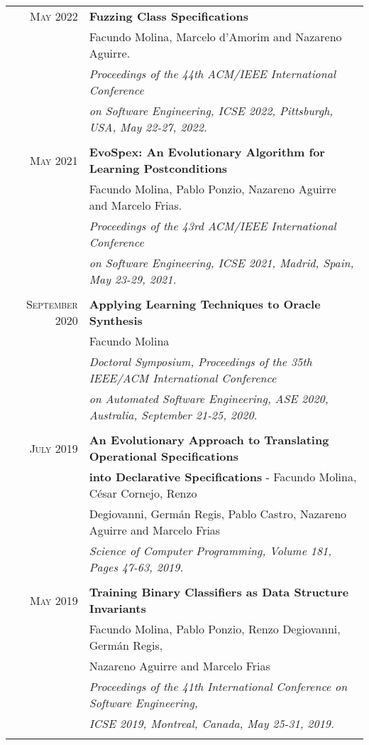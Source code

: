 \documentclass[a4paper,10pt]{article} %
\begin{document}
\begin{longtable}{rl}
\textsc{May} 2022  & \textbf{Fuzzing Class Specifications} \\
	& Facundo Molina, Marcelo d'Amorim and Nazareno Aguirre. \\
	& \textit{Proceedings of the 44th ACM/IEEE International Conference} \\
	& \textit{on Software Engineering, ICSE 2022, Pittsburgh, USA, May 22-27, 2022.} \\ & \\

\textsc{May} 2021  & \textbf{EvoSpex: An Evolutionary Algorithm for Learning Postconditions} \\
& Facundo Molina, Pablo Ponzio, Nazareno Aguirre and Marcelo Frias. \\
& \textit{Proceedings of the 43rd ACM/IEEE International Conference} \\
& \textit{on Software Engineering, ICSE 2021, Madrid, Spain, May 23-29, 2021.} \\ & \\

\textsc{September} 2020  & \textbf{Applying Learning Techniques to Oracle Synthesis} \\
& Facundo Molina \\
& \textit{Doctoral Symposium, Proceedings of the 35th IEEE/ACM International Conference} \\
& \textit{on Automated Software Engineering, ASE 2020, Australia, September 21-25, 2020.} \\ & \\

\textsc{July} 2019  & \textbf{An Evolutionary Approach to Translating Operational Specifications} \\ & \textbf{into Declarative Specifications} - Facundo Molina, César Cornejo, Renzo\\ 
& Degiovanni, Germán Regis, Pablo Castro, Nazareno Aguirre and Marcelo Frias \\
& \textit{Science of Computer Programming, Volume 181, Pages 47-63, 2019.} \\ & \\

\textsc{May} 2019  & \textbf{Training Binary Classifiers as Data Structure Invariants} \\ 
& Facundo Molina, Pablo Ponzio, Renzo Degiovanni, Germán Regis, \\ 
& Nazareno Aguirre and Marcelo Frias \\
& \textit{Proceedings of the 41th International Conference on Software Engineering,} \\
& \textit{ICSE 2019, Montreal, Canada, May 25-31, 2019.} \\ & \\


\end{longtable}
\end{document}
